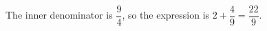The inner denominator is $\dfrac{9}{4}$, so the expression is $2+\dfrac{4}{9}=\boxed{\dfrac{22}{9}}$.
